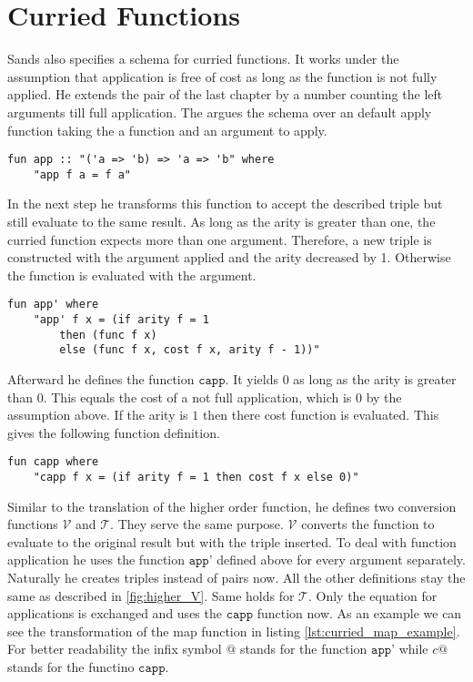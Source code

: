 
\section{Curried Functions} \label{chapter:rel_curried}

Sands also specifies a schema for curried functions.
It works under the assumption that application is free of cost as long as the function is not fully applied.
He extends the pair of the last chapter by a number counting the left arguments till full application.
The argues the schema over an default apply function taking the a function and an argument to apply.
\begin{lstlisting}[language=isabelle,mathescape=true,caption=Example apply function]
  fun app :: "('a => 'b) => 'a => 'b" where
    "app f a = f a"
\end{lstlisting}

In the next step he transforms this function to accept the described triple but still evaluate to the same result.
As long as the arity is greater than one, the curried function expects more than one argument.
Therefore, a new triple is constructed with the argument applied and the arity decreased by 1.
Otherwise the function is evaluated with the argument.
\begin{lstlisting}[language=isabelle,mathescape=true,label=lst:curried_app',caption=Apply function on function argument triple]
  fun app' where
    "app' f x = (if arity f = 1
        then (func f x)
        else (func f x, cost f x, arity f - 1))"
\end{lstlisting}

Afterward he defines the function $\texttt{capp}$.
It yields $0$ as long as the arity is greater than $0$.
This equals the cost of a not full application, which is $0$ by the assumption above.
If the arity is $1$ then there cost function is evaluated.
This gives the following function definition.
\begin{lstlisting}[language=isabelle,mathescape=true,label=lst:curried_capp,caption=Timing function of apply function]
  fun capp where
    "capp f x = (if arity f = 1 then cost f x else 0)"
\end{lstlisting}

Similar to the translation of the higher order function, he defines two conversion functions $\mathcal{V}$ and $\mathcal{T}$.
They serve the same purpose.
$\mathcal{V}$ converts the function to evaluate to the original result but with the triple inserted.
To deal with function application he uses the function $\texttt{app'}$ defined above for every argument separately.
Naturally he creates triples instead of pairs now.
All the other definitions stay the same as described in \ref{fig:higher_V}.
Same holds for $\mathcal{T}$.
Only the equation for applications is exchanged and uses the $\texttt{capp}$ function now.
As an example we can see the transformation of the map function in listing \ref{lst:curried_map_example}.
For better readability the infix symbol $@$ stands for the function $\texttt{app'}$ while $c@$ stands for the functino $\texttt{capp}$.

